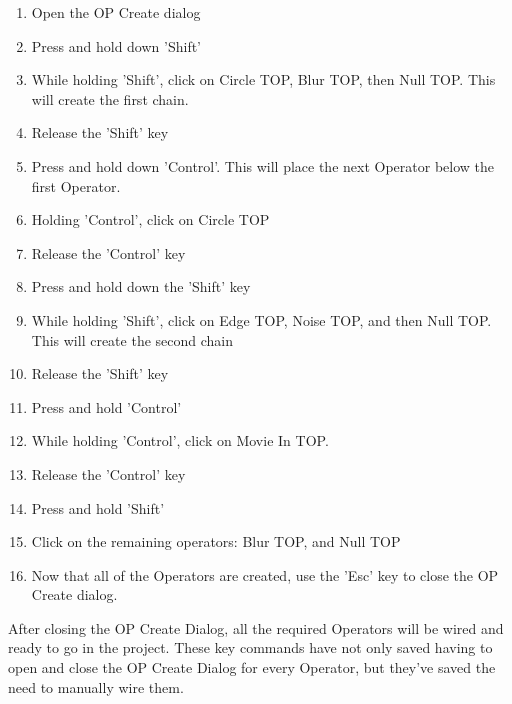 \begin{fullwidth}
\begin{enumerate}
\item Open the OP Create dialog
\item Press and hold down 'Shift'
\item While holding 'Shift', click on Circle TOP, Blur TOP, then Null TOP. This will create the first chain.
\item Release the 'Shift' key 
\item Press and hold down 'Control'. This will place the next Operator below the first Operator.
\item Holding 'Control', click on Circle TOP
\item Release the 'Control' key
\item Press and hold down the 'Shift' key
\item While holding 'Shift', click on Edge TOP, Noise TOP, and then Null TOP. This will create the second chain 
\item Release the 'Shift' key
\item Press and hold 'Control'
\item While holding 'Control', click on Movie In TOP. 
\item Release the 'Control' key
\item Press and hold 'Shift' 
\item Click on the remaining operators: Blur TOP, and Null TOP
\item Now that all of the Operators are created, use the 'Esc' key to close the OP Create dialog.
\end{enumerate}

After closing the OP Create Dialog, all the required Operators will be wired and ready to go in the project. These key commands have not only saved having to open and close the OP Create Dialog for every Operator, but they've saved the need to manually wire them.

\end{fullwidth}


